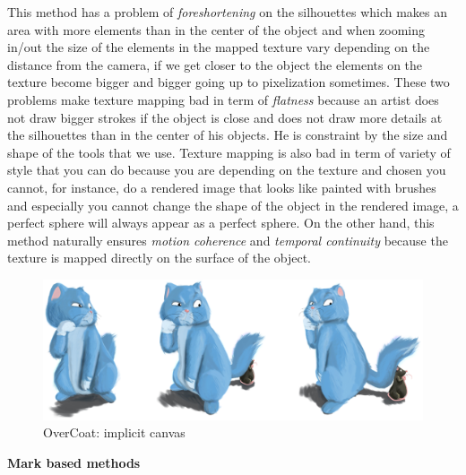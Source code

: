 This method has a problem of \textit{foreshortening} on the silhouettes which makes an area with more elements than in the center of the object and when zooming in/out the size of the elements in the mapped texture vary depending on the distance from the camera, if we get closer to the object the elements on the texture become bigger and bigger going up to pixelization sometimes. These two problems make texture mapping bad in term of \textit{flatness} because an artist does not draw bigger strokes if the object is close and does not draw more details at the silhouettes than in the center of his objects. He is constraint by the size and shape of the tools that we use. Texture mapping is also bad in term of variety of style that you can do because you are depending on the texture and chosen you cannot, for instance, do a rendered image that looks like painted with brushes and especially you cannot change the shape of the object in the rendered image, a perfect sphere will always appear as a perfect sphere. On the other hand, this method naturally ensures \textit{motion coherence} and \textit{temporal continuity} because the texture is mapped directly on the surface of the object. \newline




\begin{figure}[H]
    \begin{center}

    \includegraphics[scale=0.5]{images/overcoat.jpg}
    \end{center}
    \caption{OverCoat: implicit canvas \cite{schmid_overcoat:_2011}}
    \label{overcoat_figure}
\end{figure}

\textbf{Mark based methods}

